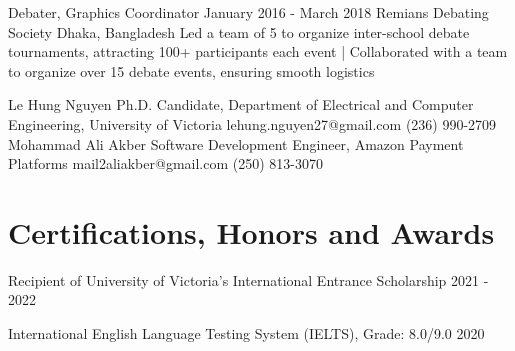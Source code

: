 \documentclass[a4paper,10pt]{article}
\begin{document}
\relevantexperience
{Debater, Graphics Coordinator}
{January 2016 - March 2018}
{Remians Debating Society}
{Dhaka, Bangladesh}
{Led a team of 5 to organize inter-school debate tournaments, attracting 100+ participants each event
| Collaborated with a team to organize over 15 debate events, ensuring smooth logistics 
}


\begin{references}
        {Le Hung Nguyen}
        {Ph.D. Candidate, Department of Electrical and}
        {Computer Engineering, University of Victoria}
        {lehung.nguyen27@gmail.com}
        {(236) 990-2709}
    \hfill
        {Mohammad Ali Akber}
        {Software Development Engineer,}
        {Amazon Payment Platforms}
        {mail2aliakber@gmail.com}
        {(250) 813-3070}
\end{references}

\section{Certifications, Honors and Awards}
\honorsawards
{Recipient of University of Victoria’s International Entrance Scholarship}
{2021 - 2022}

\honorsawards
{International English Language Testing System (IELTS), Grade: 8.0/9.0}
{2020}
\end{document}

